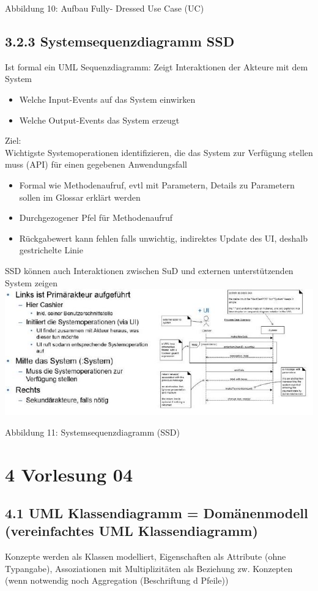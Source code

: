 \documentclass[10pt]{article}
\begin{document}
Abbildung 10: Aufbau Fully- Dressed Use Case (UC)

\subsection*{3.2.3 Systemsequenzdiagramm SSD}
Ist formal ein UML Sequenzdiagramm: Zeigt Interaktionen der Akteure mit dem System

\begin{itemize}
  \item Welche Input-Events auf das System einwirken
  \item Welche Output-Events das System erzeugt
\end{itemize}

Ziel:\\
Wichtigste Systemoperationen identifizieren, die das System zur Verfügung stellen muss (API) für einen gegebenen Anwendungsfall

\begin{itemize}
  \item Formal wie Methodenaufruf, evtl mit Parametern, Details zu Parametern sollen im Glossar erklärt werden
  \item Durchgezogener Pfel für Methodenaufruf
  \item Rückgabewert kann fehlen falls unwichtig, indirektes Update des UI, deshalb gestrichelte Linie
\end{itemize}

SSD können auch Interaktionen zwischen SuD und externen unterstützenden System zeigen\\
\includegraphics[max width=\textwidth, center]{2024_12_29_0d1d7b5551ea1b4b41bdg-06}

Abbildung 11: Systemsequenzdiagramm (SSD)

\section*{4 Vorlesung 04}
\subsection*{4.1 UML Klassendiagramm = Domänenmodell (vereinfachtes UML Klassendiagramm)}
Konzepte werden als Klassen modelliert, Eigenschaften als Attribute (ohne Typangabe), Assoziationen mit Multiplizitäten als Beziehung zw. Konzepten (wenn notwendig noch Aggregation (Beschriftung d Pfeile))
\end{document}

